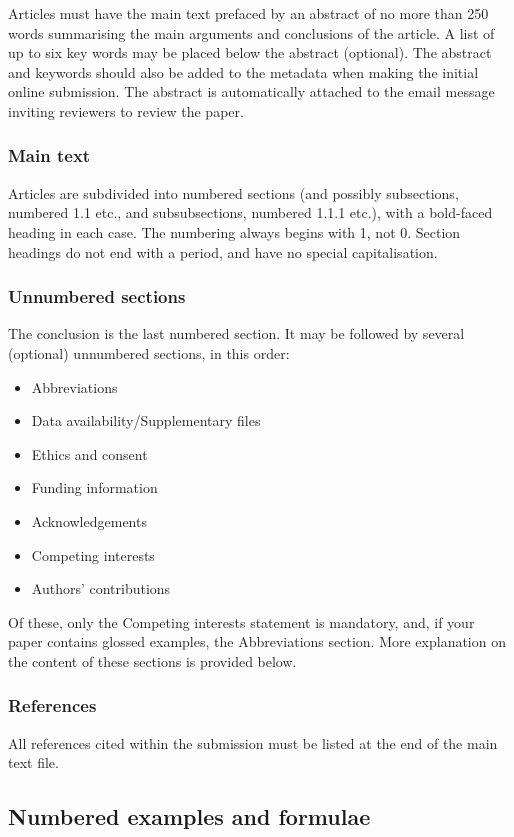\documentclass[charis,linguex]{glossa}
\begin{document}
Articles must have the main text prefaced by an abstract of no more than 250 words summarising the main arguments and conclusions of the article. A list of up to six key words may be placed below the abstract (optional). The abstract and keywords should also be added to the metadata when making the initial online submission. The abstract is automatically attached to the email message inviting reviewers to review the paper.

\subsubsection{Main text}

Articles are subdivided into numbered sections (and possibly subsections, numbered 1.1 etc., and subsubsections, numbered 1.1.1 etc.), with a bold-faced heading in each case. The numbering always begins with 1, not 0. Section headings do not end with a period, and have no special capitalisation.

\subsubsection{Unnumbered sections}
The conclusion is the last numbered section. It may be followed by several (optional) unnumbered sections, in this order:
\begin{itemize}
\item Abbreviations
\item Data availability/Supplementary files
\item Ethics and consent
\item Funding information
\item Acknowledgements
\item Competing interests
\item Authors' contributions
\end{itemize}

\noindent Of these, only the Competing interests statement is mandatory, and, if your paper contains glossed examples, the Abbreviations section. More explanation on the content of these sections is provided below.

\subsubsection{References}
All references cited within the submission must be listed at the end of the main text file.

\subsection{Numbered examples and formulae}
\end{document}
